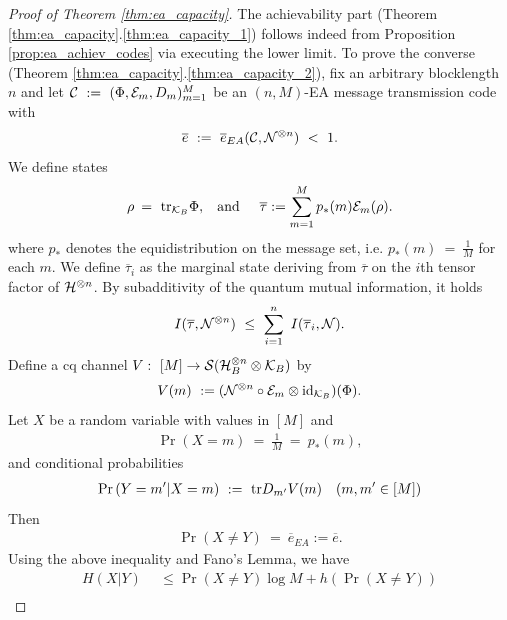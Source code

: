 \begin{proof}[Proof of Theorem \ref{thm:ea_capacity}]
	The achievability part (Theorem \ref{thm:ea_capacity}.\ref{thm:ea_capacity_1}) follows indeed from Proposition \ref{prop:ea_achiev_codes} via executing the lower limit. To prove the converse (Theorem \ref{thm:ea_capacity}.\ref{thm:ea_capacity_2}), fix an arbitrary blocklength $n$ and let ${\mathcal C} \ := \ (\Phi, {\mathcal E}_m, D_m)_{m=1}^M$
	be an $(n,M)$-EA message transmission code with
	\begin{align*}
	\overline{e} \ := \ \overline{e}_{EA}(\cC,\cN^{\otimes n}) \ < \ 1.
	\end{align*}
	We define states 
	\begin{align}
	\rho \:= \ \mathrm{tr}_{{\mathcal K}_B} \Phi, \hspace{.3cm} \text{and} \hspace{.5cm} \overline{\tau} := \sum_{m=1}^M 
	p_{\ast}(m) {\mathcal E}_m(\rho).
	\end{align}
	where $p_\ast$ denotes the equidistribution on the message set, i.e. 
	$
	p_{\ast}(m) \ = \ \frac{1}{M} 
	$
	for each $m$. We define $\overline{\tau}_i$ as the marginal state deriving from $\overline{\tau}$ on the $i$th tensor factor of ${\mathcal H}^{\otimes n}$. 
	By subadditivity of the quantum mutual information, it holds
	\begin{align}
	I(\overline{\tau}, \cN^{\otimes n}) \ \leq \ \sum_{i=1}^n \ I(\overline{\tau}_i, \cN).
	\label{ent_ass_conv_subadd_used}
	\end{align}
	Define a cq channel $V: \ [M] \rightarrow {\mathcal S}({\mathcal H}_B^{\otimes n} \otimes {\mathcal K}_B)$ by
	\begin{align*}
	V(m) \ := ({\mathcal N}^{\otimes n}\circ {\mathcal E}_m \otimes \mathrm{id}_{{\mathcal K}_B})(\Phi).
	\end{align*}
	Let $X$ be a random variable with values in $[M]$ and 
	\begin{align}
	\Pr\left(X =m \right) \ = \ \frac{1}{M} \ = \ p_\ast(m),
	\end{align}
	and conditional probabilities 
	\begin{align*}
	\Pr\left(Y = m'|X = m \right) \ := \ \mathrm{tr} D_{m'} V(m) &&(m,m' \in [M])
	\end{align*}
	Then
	\begin{align*}
	\Pr\left(X \neq Y\right) \ = \ \overline{e}_{EA} := \overline{e}.
	\end{align*}
	Using the above inequality and Fano's Lemma, we have
	\begin{align}
	H(X|Y) \ 
	& \ \leq \Pr\left(X \neq Y\right) \log M + h(\Pr(X \neq Y))  \nonumber \\

\end{align}
\end{proof}
